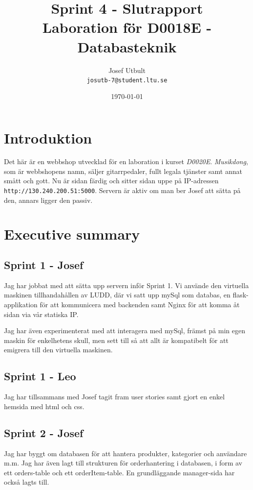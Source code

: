 \documentclass[a4paper]{article}
\title{Sprint 4 - Slutrapport \\ 
\large{Laboration för D0018E - Databasteknik}}
\author{Josef Utbult \\
{\tt josutb-7@student.ltu.se}}
\date{\today}
\begin{document}
\maketitle
\newpage
\tableofcontents

\section{Introduktion}
Det här är en webbshop utvecklad för en laboration i kurset \textit{D0020E}. \textit{Musikdong}, som är webbshopens namn, säljer gitarrpedaler, fullt legala tjänster samt annat smått och gott. Nu är sidan färdig och sitter sidan uppe på IP-adressen \texttt{http://130.240.200.51:5000}. Servern är aktiv om man ber Josef att sätta på den, annars ligger den passiv.

\section{Executive summary}
\subsection{Sprint 1 - Josef}
Jag har jobbat med att sätta upp servern inför Sprint 1. Vi använde den virtuella maskinen tillhandahållen av LUDD, där vi satt upp mySql som databas, en flask-applikation för att kommunicera med backenden samt Nginx för att komma åt sidan via vår statiska IP.

Jag har även experimenterat med att interagera med mySql, främst på min egen maskin för enkelhetens skull, men sett till så att allt är kompatibelt för att emigrera till den virtuella maskinen.

\subsection{Sprint 1 - Leo}
Jag har tillsammans med Josef tagit fram user stories samt gjort en enkel hemsida med html och css. 

\subsection{Sprint 2 - Josef}
Jag har byggt om databasen för att hantera produkter, kategorier och användare m.m. Jag har även lagt till strukturen för orderhantering i databasen, i form av ett orders-table och ett orderItem-table. En grundläggande manager-sida har också lagts till.
\end{document}
